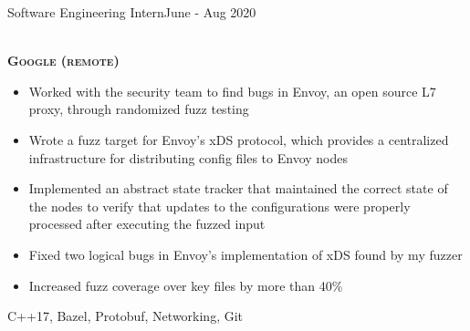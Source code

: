 %
%
%

\begin{projects}

    \work
	{Software Engineering Intern}{June - Aug 2020}
	{
		\\ \textbf{\textsc{Google (remote)}}
	    \begin{itemize}
			\item Worked with the security team to find bugs in Envoy, an open source L7 proxy, through randomized fuzz testing
			\item Wrote a fuzz target for Envoy's xDS protocol, which provides a centralized infrastructure for distributing config files to Envoy nodes
			\item Implemented an abstract state tracker that maintained the correct state of the nodes to verify that updates to the configurations were properly processed after executing the fuzzed input
			\item Fixed two logical bugs in Envoy's implementation of xDS found by my fuzzer
			\item Increased fuzz coverage over key files by more than 40\%
        \end{itemize}
    }
	{C++17, Bazel, Protobuf, Networking, Git} \\

\end{projects}

